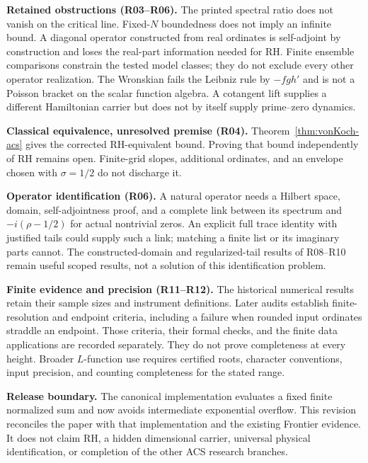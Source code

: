 \documentclass[11pt,a4paper]{article}
\theoremstyle{plain}
\theoremstyle{definition}
\theoremstyle{remark}
\begin{document}
\medskip\noindent\textbf{Retained obstructions (R03--R06).}
The printed spectral ratio does not vanish on the critical line.
Fixed-$N$ boundedness does not imply an infinite bound. A diagonal operator
constructed from real ordinates is self-adjoint by construction and loses
the real-part information needed for RH. Finite ensemble comparisons constrain
the tested model classes; they do not exclude every other operator realization.
The Wronskian fails the Leibniz rule by $-fgh'$ and is not a Poisson bracket
on the scalar function algebra. A cotangent lift supplies a different
Hamiltonian carrier but does not by itself supply prime--zero dynamics.

\medskip\noindent\textbf{Classical equivalence, unresolved premise (R04).}
Theorem~\ref{thm:vonKoch-acs} gives the corrected RH-equivalent bound.
Proving that bound independently of RH remains open. Finite-grid slopes,
additional ordinates, and an envelope chosen with $\sigma=1/2$ do not
discharge it.

\medskip\noindent\textbf{Operator identification (R06).}
A natural operator needs a Hilbert space, domain, self-adjointness proof,
and a complete link between its spectrum and $-i(\rho-1/2)$ for actual
nontrivial zeros. An explicit full trace identity with justified tails could
supply such a link; matching a finite list or its imaginary parts cannot.
The constructed-domain and regularized-tail results of R08--R10 remain
useful scoped results, not a solution of this identification problem.

\medskip\noindent\textbf{Finite evidence and precision (R11--R12).}
The historical numerical results retain their sample sizes and instrument
definitions. Later audits establish finite-resolution and endpoint criteria,
including a failure when rounded input ordinates straddle an endpoint.
Those criteria, their formal checks, and the finite data applications are
recorded separately. They do not prove completeness at every height.
Broader $L$-function use requires certified roots, character conventions,
input precision, and counting completeness for the stated range.

\medskip\noindent\textbf{Release boundary.}
The canonical implementation evaluates a fixed finite normalized sum and
now avoids intermediate exponential overflow. This revision reconciles
the paper with that implementation and the existing Frontier evidence.
It does not claim RH, a hidden dimensional carrier, universal physical
identification, or completion of the other ACS research branches.
\end{document}
